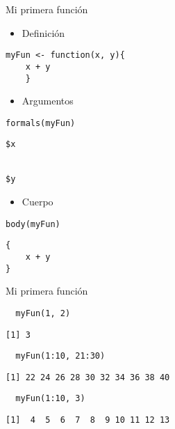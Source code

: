 \documentclass[xcolor={usenames,svgnames,dvipsnames}]{beamer}
\begin{document}
\begin{frame}[fragile,label={sec:orgheadline3}]{Mi primera función}
 \begin{itemize}
\item Definición
\end{itemize}
\lstset{language=R,label= ,caption= ,captionpos=b,numbers=none}
\begin{lstlisting}
myFun <- function(x, y){
    x + y
    }
\end{lstlisting}

\begin{itemize}
\item Argumentos
\end{itemize}
\lstset{language=R,label= ,caption= ,captionpos=b,numbers=none}
\begin{lstlisting}
formals(myFun)
\end{lstlisting}

\begin{verbatim}
$x


$y
\end{verbatim}

\begin{itemize}
\item Cuerpo
\end{itemize}
\lstset{language=R,label= ,caption= ,captionpos=b,numbers=none}
\begin{lstlisting}
body(myFun)
\end{lstlisting}

\begin{verbatim}
{
    x + y
}
\end{verbatim}
\end{frame}

\begin{frame}[fragile,label={sec:orgheadline4}]{Mi primera función}
 \lstset{language=R,label= ,caption= ,captionpos=b,numbers=none}
\begin{lstlisting}
  myFun(1, 2)
\end{lstlisting}

\begin{verbatim}
[1] 3
\end{verbatim}

\lstset{language=R,label= ,caption= ,captionpos=b,numbers=none}
\begin{lstlisting}
  myFun(1:10, 21:30)
\end{lstlisting}

\begin{verbatim}
[1] 22 24 26 28 30 32 34 36 38 40
\end{verbatim}

\lstset{language=R,label= ,caption= ,captionpos=b,numbers=none}
\begin{lstlisting}
  myFun(1:10, 3)
\end{lstlisting}

\begin{verbatim}
[1]  4  5  6  7  8  9 10 11 12 13
\end{verbatim}
\end{frame}
\end{document}
